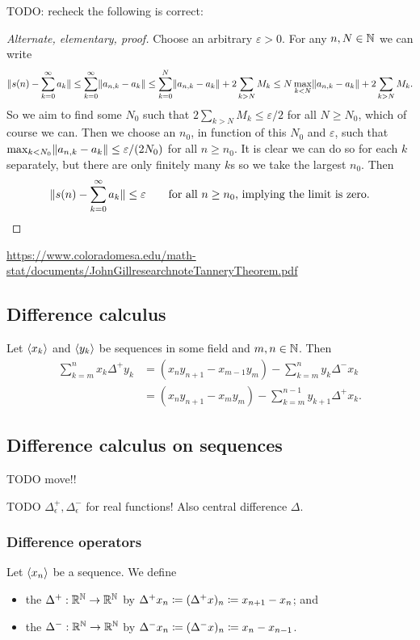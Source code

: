 TODO: recheck the following is correct:
\begin{proof}[Alternate, elementary, proof]
Choose an arbitrary $\varepsilon>0$. For any $n,N\in\mathbb{N}$ we can write
\[ \lVert s(n) - \sum_{k=0}^\infty a_k\rVert \leq \sum_{k=0}^\infty\lVert a_{n,k} -  a_k\rVert\leq \sum_{k=0}^N\lVert a_{n,k} -  a_k\rVert + 2\sum_{k>N}M_k \leq N\max_{k<N}\lVert a_{n,k} -  a_k\rVert + 2\sum_{k>N}M_k. \]
So we aim to find some $N_0$ such that $2\sum_{k>N}M_k \leq \varepsilon/2$ for all $N\geq N_0$, which of course we can. Then we choose an $n_0$, in function of this $N_0$ and $\varepsilon$, such that $\max_{k<N_0}\lVert a_{n,k} -  a_k\rVert\leq \varepsilon/(2N_0)$ for all $n\geq n_0$. It is clear we can do so for each $k$ separately, but there are only finitely many $k$s so we take the largest $n_0$. Then
\[ \lVert s(n) - \sum_{k=0}^\infty a_k\rVert \leq \varepsilon \qquad \text{for all $n\geq n_0$, implying the limit is zero.} \]
\end{proof}
\url{https://www.coloradomesa.edu/math-stat/documents/JohnGillresearchnoteTanneryTheorem.pdf}

\subsection{Difference calculus}

\begin{proposition}
Let $\left\langle x_k \right\rangle$ and $\left\langle y_k \right\rangle$ be sequences in some field and $m,n\in \mathbb{N}$. Then
\begin{align*}
\sum_{k=m}^n x_k\Delta^+y_k &= (x_ny_{n+1} - x_{m-1}y_m)-\sum_{k=m}^ny_k\Delta^-x_k \\
&= (x_ny_{n+1} - x_my_m) - \sum_{k=m}^{n-1}y_{k+1}\Delta^+x_k.
\end{align*}
\end{proposition}

\subsection{Difference calculus on sequences}
TODO move!!

TODO $\Delta^+_\epsilon, \Delta^-_\epsilon$ for real functions! Also central difference $\Delta$.
\subsubsection{Difference operators}
\begin{definition}
Let $\left\langle x_n \right\rangle$ be a sequence. We define
\begin{itemize}
\item the  $\Delta^+: \mathbb{R}^{\mathbb{N}} \to \mathbb{R}^{\mathbb{N}}$ by $\Delta^+ x_n \coloneqq (\Delta^+x)_n \coloneqq x_{n+1} - x_n$; and
\item the  $\Delta^-: \mathbb{R}^{\mathbb{N}} \to \mathbb{R}^{\mathbb{N}}$ by $\Delta^- x_n \coloneqq (\Delta^-x)_n \coloneqq x_{n} - x_{n-1}$.
\end{itemize}
\end{definition}


